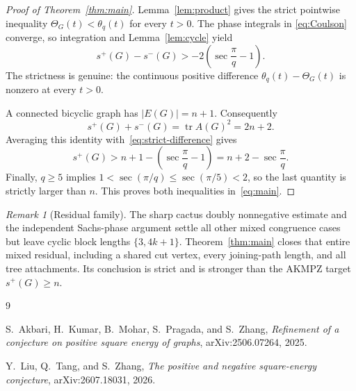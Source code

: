 \documentclass[11pt]{article}
\theoremstyle{remark}
\newtheorem{remark}[theorem]{Remark}
\begin{document}
\begin{proof}[Proof of Theorem~\ref{thm:main}]
Lemma~\ref{lem:product} gives the strict pointwise inequality
$\Theta_G(t)<\theta_q(t)$ for every $t>0$.  The phase integrals in
\eqref{eq:Coulson} converge, so integration and
Lemma~\ref{lem:cycle} yield
\begin{equation}\label{eq:strict-difference}
 s^+(G)-s^-(G)
 >-2\left(\sec\frac\pi q-1\right).
\end{equation}
The strictness is genuine: the continuous positive difference
$\theta_q(t)-\Theta_G(t)$ is nonzero at every $t>0$.

A connected bicyclic graph has $|E(G)|=n+1$.  Consequently
\[
 s^+(G)+s^-(G)=\operatorname{tr}A(G)^2=2n+2.
\]
Averaging this identity with~\eqref{eq:strict-difference} gives
\[
 s^+(G)>n+1-\left(\sec\frac\pi q-1\right)
        =n+2-\sec\frac\pi q.
\]
Finally, $q\geq5$ implies
$1<\sec(\pi/q)\leq\sec(\pi/5)<2$, so the last quantity is strictly larger
than $n$.  This proves both inequalities in~\eqref{eq:main}.
\end{proof}

\begin{remark}[Residual family]
The sharp cactus doubly nonnegative estimate and the independent Sachs-phase
argument settle all other mixed congruence cases but leave cyclic block
lengths $\{3,4k+1\}$.  Theorem~\ref{thm:main} closes that entire mixed
residual, including a shared cut vertex, every joining-path length, and all
tree attachments.  Its conclusion is strict and is stronger than the AKMPZ
target $s^+(G)\geq n$.
\end{remark}

\begin{thebibliography}{9}

S.~Akbari, H.~Kumar, B.~Mohar, S.~Pragada, and S.~Zhang,
\emph{Refinement of a conjecture on positive square energy of graphs},
arXiv:2506.07264, 2025.

Y.~Liu, Q.~Tang, and S.~Zhang,
\emph{The positive and negative square-energy conjecture},
arXiv:2607.18031, 2026.

\end{thebibliography}
\end{document}
